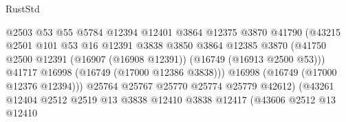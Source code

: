 \begin{lexlean}{RustStd}
\begin{coremodule}
                                            @2503
                                            @53
                                            @55
                                            @5784
                                            @12394
                                            @12401
                                            @3864
                                            @12375
                                            @3870
                                            @41790
                                            (@43215
                                              @2501
                                              @101
                                              @53
                                              @16
                                              @12391
                                              @3838
                                              @3850
                                              @3864
                                              @12385
                                              @3870
                                              (@41750
                                                @2500
                                                @12391
                                                (@16907 (@16908 @12391))
                                                (@16749 (@16913 @2500 @53)))
                                              @41717
                                              @16998
                                              (@16749 (@17000 @12386 @3838)))
                                            @16998
                                            (@16749 (@17000 @12376 @12394)))
                                          @25764
                                          @25767
                                          @25770
                                          @25774
                                          @25779
                                          @42612)
                                        (@43261
                                          @12404
                                          @2512
                                          @2519
                                          @13
                                          @3838
                                          @12410
                                          @3838
                                          @12417
                                          (@43606
                                            @2512
                                            @13
                                            @12410

\end{coremodule}
\end{lexlean}
